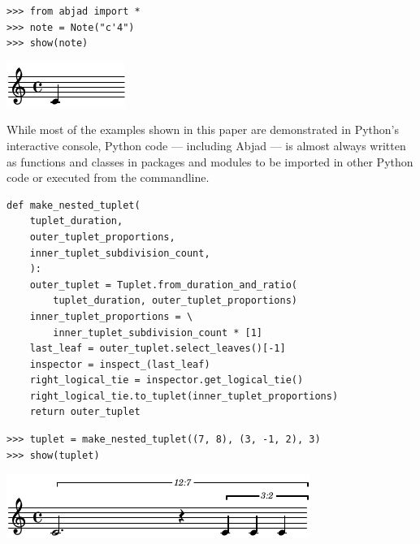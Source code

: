 \documentclass{article}
\begin{document}
\begin{lstlisting}
>>> from abjad import *
>>> note = Note("c'4")
>>> show(note)
\end{lstlisting}
\includegraphics{assets/lilypond-c018a545d264ff34225e9a3a5babb6c1.pdf}

While most of the examples shown in this paper are demonstrated in Python's
interactive console, Python code --- including Abjad --- is almost always
written as functions and classes in packages and modules to be imported in
other Python code or executed from the commandline.

\begin{lstlisting}
def make_nested_tuplet(
    tuplet_duration,
    outer_tuplet_proportions,
    inner_tuplet_subdivision_count,
    ):
    outer_tuplet = Tuplet.from_duration_and_ratio(
        tuplet_duration, outer_tuplet_proportions)
    inner_tuplet_proportions = \
        inner_tuplet_subdivision_count * [1]
    last_leaf = outer_tuplet.select_leaves()[-1]
    inspector = inspect_(last_leaf)
    right_logical_tie = inspector.get_logical_tie()
    right_logical_tie.to_tuplet(inner_tuplet_proportions)
    return outer_tuplet
\end{lstlisting}

\begin{lstlisting}
>>> tuplet = make_nested_tuplet((7, 8), (3, -1, 2), 3)
>>> show(tuplet)
\end{lstlisting}
\includegraphics{assets/lilypond-4926e77647583925d3a89653f8577025.pdf}
\end{document}
